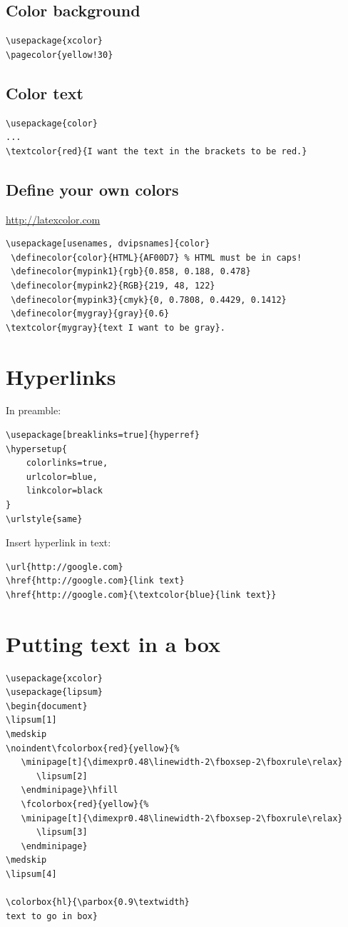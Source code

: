 \documentclass{article}
\begin{document}
\begin{minipage}{0.5\textwidth}
\subsection{Color background }
\begin{verbatim}
\usepackage{xcolor}
\pagecolor{yellow!30}
\end{verbatim}

\subsection{Color text}
\begin{verbatim}
\usepackage{color}
...
\textcolor{red}{I want the text in the brackets to be red.}
\end{verbatim}
\end{minipage}
\begin{minipage}{0.5\textwidth}
\subsection{Define your own colors}\label{definecolors}
\url{http://latexcolor.com}
\begin{verbatim}
\usepackage[usenames, dvipsnames]{color}
 \definecolor{color}{HTML}{AF00D7} % HTML must be in caps!
 \definecolor{mypink1}{rgb}{0.858, 0.188, 0.478}
 \definecolor{mypink2}{RGB}{219, 48, 122}
 \definecolor{mypink3}{cmyk}{0, 0.7808, 0.4429, 0.1412}
 \definecolor{mygray}{gray}{0.6}
\textcolor{mygray}{text I want to be gray}.
\end{verbatim}
\end{minipage}

\section{Hyperlinks}
In preamble:
\begin{verbatim}
\usepackage[breaklinks=true]{hyperref}
\hypersetup{
    colorlinks=true,
    urlcolor=blue,
    linkcolor=black
}
\urlstyle{same}
\end{verbatim}

Insert hyperlink in text:
\begin{verbatim}
\url{http://google.com}
\href{http://google.com}{link text}
\href{http://google.com}{\textcolor{blue}{link text}}
\end{verbatim}

\section{Putting text in a box}
\begin{verbatim}
\usepackage{xcolor}
\usepackage{lipsum}
\begin{document}
\lipsum[1]
\medskip
\noindent\fcolorbox{red}{yellow}{%
   \minipage[t]{\dimexpr0.48\linewidth-2\fboxsep-2\fboxrule\relax}
      \lipsum[2]
   \endminipage}\hfill
   \fcolorbox{red}{yellow}{%
   \minipage[t]{\dimexpr0.48\linewidth-2\fboxsep-2\fboxrule\relax}
      \lipsum[3]
   \endminipage}
\medskip
\lipsum[4]

\colorbox{hl}{\parbox{0.9\textwidth}
text to go in box}
\end{verbatim}
\end{document}
